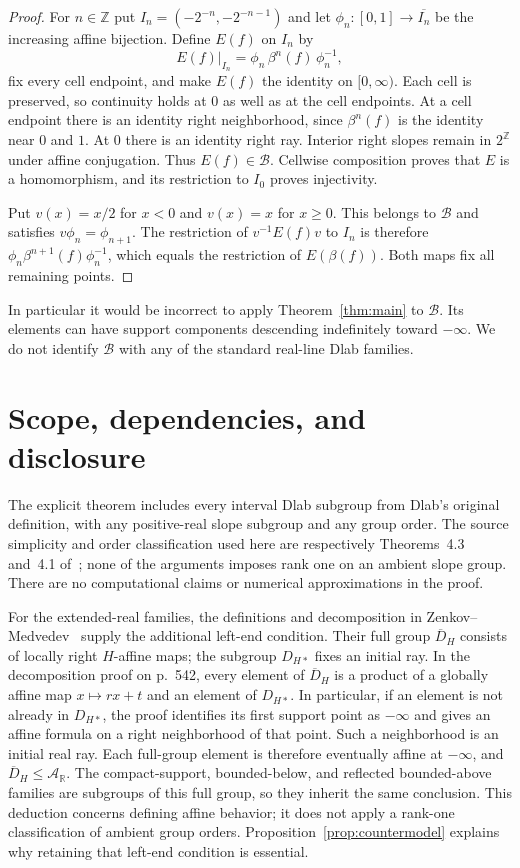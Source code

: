 \documentclass[10pt]{article}
\theoremstyle{definition}
\newcommand{\R}{\mathbb R}
\newcommand{\Z}{\mathbb Z}
\newcommand{\AR}{\mathcal A_{\R}}
\begin{document}
\begin{proof}
For $n\in\Z$ put
$I_n=(-2^{-n},-2^{-n-1})$ and let
$\phi_n:[0,1]\to\overline{I_n}$ be the increasing affine bijection.
Define $E(f)$ on $I_n$ by
\[
 E(f)|_{I_n}=\phi_n\,\beta^n(f)\,\phi_n^{-1},
\]
fix every cell endpoint, and make $E(f)$ the identity on $[0,\infty)$.
Each cell is preserved, so continuity holds at $0$ as well as at
the cell endpoints. At a cell endpoint there is an identity right
neighborhood, since $\beta^n(f)$ is the identity near $0$ and $1$.
At $0$ there is an identity right ray. Interior right slopes remain
in $2^{\Z}$ under affine conjugation. Thus $E(f)\in\mathcal B$.
Cellwise composition proves that $E$ is a homomorphism, and its
restriction to $I_0$ proves injectivity.

Put $v(x)=x/2$ for $x<0$ and $v(x)=x$ for $x\ge0$.
This belongs to $\mathcal B$ and satisfies
$v\phi_n=\phi_{n+1}$. The restriction of $v^{-1}E(f)v$ to
$I_n$ is therefore
$\phi_n\beta^{n+1}(f)\phi_n^{-1}$, which equals the restriction
of $E(\beta(f))$. Both maps fix all remaining points.
\end{proof}

In particular it would be incorrect to apply
Theorem~\ref{thm:main} to $\mathcal B$. Its elements can have support
components descending indefinitely toward $-\infty$. We do not
identify $\mathcal B$ with any of the standard real-line Dlab families.

\section{Scope, dependencies, and disclosure}

The explicit theorem includes every interval Dlab subgroup from
Dlab's original definition, with any positive-real slope subgroup
and any group order. The source simplicity and order classification
used here are respectively Theorems~4.3 and~4.1 of~\cite{Dlab};
none of the arguments imposes rank one on an ambient slope group.
There are no computational claims or numerical approximations in
the proof.

For the extended-real families, the definitions and decomposition
in Zenkov--Medvedev~\cite[\S2, Russian pp.~538, 542--543]{ZM}
supply the additional left-end condition. Their full group
$\overline D_H$ consists of locally right $H$-affine maps; the subgroup
$D_{H*}$ fixes an initial ray. In the decomposition proof on p.~542,
every element of $\overline D_H$ is a product of a globally affine
map $x\mapsto rx+t$ and an element of $D_{H*}$. In particular, if
an element is not already in $D_{H*}$, the proof identifies its first
support point as $-\infty$ and gives an affine formula on a right
neighborhood of that point. Such a neighborhood is an initial real
ray. Each full-group element is therefore eventually affine at
$-\infty$, and $\overline D_H\le\AR$. The compact-support,
bounded-below, and reflected bounded-above families are subgroups
of this full group, so they inherit the same conclusion.
This deduction concerns defining affine behavior; it does not apply
a rank-one classification of ambient group orders.
Proposition~\ref{prop:countermodel} explains why retaining that
left-end condition is essential.
\end{document}
